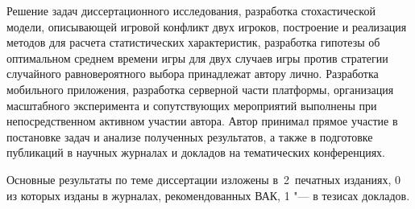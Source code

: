 {\contribution} Решение задач диссертационного исследования, разработка стохастической модели, описывающей игровой конфликт двух игроков,
построение и реализация методов для расчета статистических характеристик, разработка гипотезы об оптимальном среднем времени игры
для двух случаев игры против стратегии случайного равновероятного выбора принадлежат автору лично.
Разработка мобильного приложения, разработка серверной части платформы, организация масштабного эксперимента 
и сопутствующих мероприятий выполнены при непосредственном активном участии автора.
Автор принимал прямое участие в постановке задач и анализе полученных результатов, а также в подготовке публикаций
в научных журналах и докладов на тематических конференциях.

{%
    {\publications} Основные результаты по теме диссертации изложены
    в~2~печатных изданиях,
    0 из которых изданы в журналах, рекомендованных ВАК,
    1 "--- в тезисах докладов.
}%
